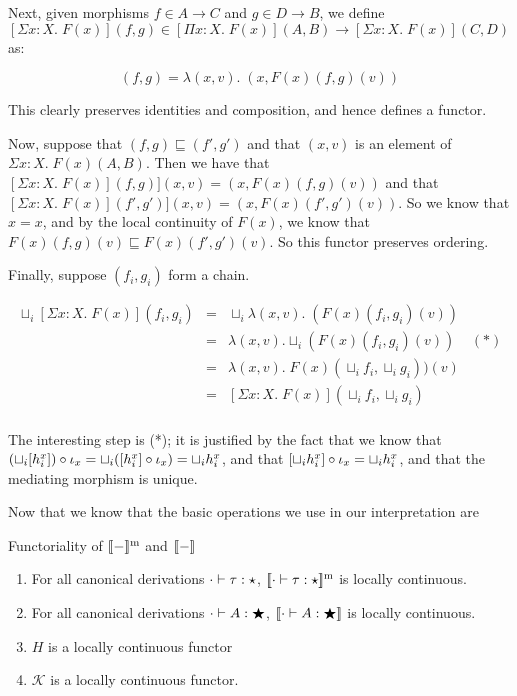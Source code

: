 \documentclass[12pt]{article}
\begin{document}
\begin{enumerate}
Next, given morphisms $f \in A \to C$ and $g \in D \to B$, we define
$[\Sigma x:X.\; F(x)](f,g) \in [\Pi x:X.\; F(x)](A,B) \to [\Sigma x:X.\; F(x)](C,D)$
as:

\begin{displaymath}
  [\Sigma x:X.\; F(x)](f,g) = \lambda (x, v).\; (x, F(x)(f,g)(v))
\end{displaymath}

This clearly preserves identities and composition, and hence defines
a functor. 

Now, suppose that $(f,g) \sqsubseteq (f',g')$ and that $(x,v)$ is
an element of $\Sigma x:X.\; F(x)(A,B)$. Then we have that
$[\Sigma x:X.\;F(x)](f,g)](x,v) = (x,F(x)(f,g)(v))$ and that
$[\Sigma x:X.\;F(x)](f',g')](x,v) = (x,F(x)(f',g')(v))$. So we
know that $x=x$, and by the local continuity of $F(x)$, we know
that $F(x)(f,g)(v) \sqsubseteq F(x)(f',g')(v)$. So this functor
preserves ordering. 

Finally, suppose $(f_i, g_i)$ form a chain. 

\begin{displaymath}
\begin{array}{lcl}
\sqcup_i [\Sigma x:X.\;F(x)](f_i,g_i) 
& = & \sqcup_i \lambda (x,v).\; (F(x)(f_i,g_i)(v)) \\
& = & \lambda (x,v). \sqcup_i (F(x)(f_i,g_i)(v)) \;\;\;\; (*) \\
& = & \lambda (x,v).\; F(x)(\sqcup_i f_i, \sqcup_i g_i))(v) \\
& = & [\Sigma x:X.\;F(x)](\sqcup_i f_i, \sqcup_i g_i) \\
\end{array}
\end{displaymath}

The interesting step is (*); it is justified by the fact
that we know that 
$(\sqcup_i [h^x_i]) \circ \inj{x} =  
\sqcup_i ([h^x_i] \circ \inj{x}) =  \sqcup_i h^x_i$, 
and that $[\sqcup_i h^x_i] \circ \inj{x} = \sqcup_i h^x_i$, 
and that the mediating morphism is unique.
\end{enumerate}

Now that we know that the basic operations we use in our
interpretation are 

\begin{lemma}{Functoriality of $\interpmono{-}$ and $\interp{-}$}
  \begin{enumerate}
  \item For all canonical derivations $\judgeWK[\cdot]{\tau}{\star}$, 
    $\interpmono{\judgeWK[\cdot]{\tau}{\star}}$ is locally continuous. 
  \item For all canonical derivations $\judgeWK[\cdot]{A}{\bigstar}$, 
    $\interp{\judgeWK[\cdot]{A}{\bigstar}}$ is locally continuous. 
  \item $H$ is a locally continuous functor
  \item $\mathcal{K}$ is a locally continuous functor. 
  \end{enumerate}
\end{lemma}
\end{document}
